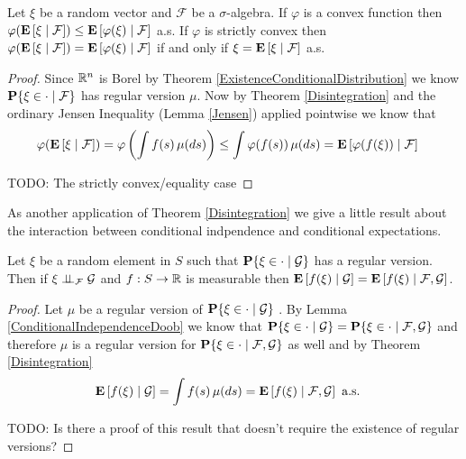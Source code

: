 \begin{thm}\label{JensenConditionalExpectation}Let $\xi$ be a random vector and $\mathcal{F}$ be a
  $\sigma$-algebra.  If $\varphi$ is a convex function then
  $\varphi(\cexpectationlong{\mathcal{F}}{\xi}) \leq
    \cexpectationlong{\mathcal{F}}{\varphi(\xi)}$ a.s.
If $\varphi$ is strictly convex then $\varphi(\cexpectationlong{\mathcal{F}}{\xi}) =
    \cexpectationlong{\mathcal{F}}{\varphi(\xi)}$ if and only if $\xi =
      \cexpectationlong{\mathcal{F}}{\xi}$ a.s.
\end{thm}
\begin{proof}
Since $\reals^n$ is Borel by Theorem
\ref{ExistenceConditionalDistribution} we know
$\cprobability{\mathcal{F}}{\xi \in \cdot}$ has regular version
$\mu$.  Now by Theorem \ref{Disintegration} and the ordinary Jensen
Inequality (Lemma \ref{Jensen}) applied pointwise we know that 
\begin{align*}
\varphi(\cexpectationlong{\mathcal{F}}{\xi}) &= 
\varphi \left( \int f(s) \, \mu(ds) \right) \leq \int \varphi (f(s))
\, \mu(ds) = \cexpectationlong{\mathcal{F}}{\varphi(f(\xi))}
\end{align*}

TODO: The strictly convex/equality case
\end{proof}

As another application of Theorem \ref{Disintegration} we give a
little result about the interaction between conditional indpendence
and conditional expectations.
\begin{cor}Let $\xi$ be a random element in $S$ such that
  $\cprobability{\mathcal{G}}{\xi  \in \cdot}$
has a regular version.  Then if
$\cindependent{\xi}{\mathcal{G}}{\mathcal{F}}$ and $f : S \to \reals$ is
measurable then
$\cexpectationlong{\mathcal{G}}{f(\xi)} = \cexpectationlong{\mathcal{F}, \mathcal{G}}{f(\xi)}$.
\end{cor}
\begin{proof}
Let $\mu$ be a regular version of $\cprobability{\mathcal{G}}{\xi  \in
  \cdot}$ .  By Lemma \ref{ConditionalIndependenceDoob} we know that
$\cprobability{\mathcal{G}}{\xi  \in \cdot} =
\cprobability{\mathcal{F}, \mathcal{G}}{\xi  \in \cdot}$ and therefore
$\mu$ is a regular version for $\cprobability{\mathcal{F}, \mathcal{G}}{\xi  \in \cdot}$ as well and
by Theorem \ref{Disintegration}
\begin{align*}
\cexpectationlong{\mathcal{G}}{f(\xi)} &= \int f(s) \, \mu(ds) =
\cexpectationlong{\mathcal{F}, \mathcal{G}}{f(\xi)} \text { a.s.}
\end{align*}

TODO: Is there a proof of this result that doesn't require the
existence of regular versions?
\end{proof}
 
